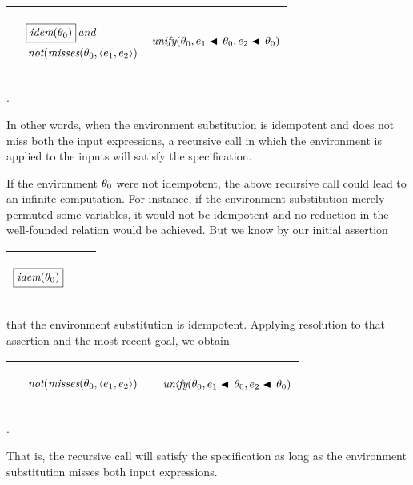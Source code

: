 \documentclass[runningheads]{llncs}
\DeclareMathOperator{\uand}{\emph{and}\,}
\DeclareMathOperator{\unot}{\emph{not}\kern-.0pt}
\DeclareMathOperator{\unify}{\emph{unify}}
\DeclareMathOperator{\idem}{\emph{idem}}
\begin{document}
\begin{center}
\begin{tabular}{|m{}|m{}||m{}|}
 \hline 
  & 
 \begin{center}
{$
\begin{aligned}
 &\boxed{\idem(\thet{0})} \uand  \\
 &\unot(\misses(\thet{0},\langle \e{1}, \e{2}\rangle)
\end{aligned}
  $}
\end{center}
& 
\vspace{5pt}
\begin{center}$\unify(\thet{0}, \e{1}\apply\,\thet{0}, \e{2}\apply\,\thet{0})$ \end{center}\\
\hline
\end{tabular}.
\end{center}
In other words, when the environment substitution is idempotent and does not miss both the input expressions, a recursive call in which the environment is applied to the inputs will satisfy the specification. 

If the environment $\theta_{0}$ were not idempotent, the above recursive call could lead to an infinite computation. For instance, if the environment substitution merely permuted some variables, it would not be idempotent and no reduction in the well-founded relation would be achieved.  But we know by our initial assertion
\begin{center}
\begin{tabular}{|m{}|m{}||m{}|}
 \hline 
\vspace{-.0cm}\begin{center}$\boxed{\idem(\thet{0})} $\end{center} &  & \\
\hline
\end{tabular}
\end{center}
that the environment substitution is idempotent. Applying resolution to that assertion and the most recent goal, we obtain
\begin{center}
\begin{tabular}{|m{}|m{}||m{}|}
 \hline 
  & 
 \begin{center}
{$
\begin{aligned}
 &\unot(\misses(\thet{0},\langle \e{1}, \e{2}\rangle)
\end{aligned}
  $}
\end{center}
& 
\vspace{5pt}
\begin{center}$\unify(\thet{0}, \e{1}\apply\,\thet{0}, \e{2}\apply\,\thet{0})$ \end{center}\\
\hline
\end{tabular}.
\end{center}
That is, the recursive call will satisfy the specification as long as the environment substitution misses both input expressions.  
\end{document}

